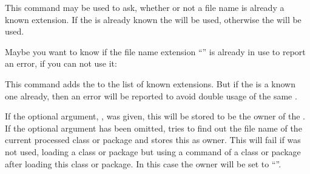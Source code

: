 \begin{Declaration}
\end{Declaration}
%
This command may be used to ask, whether or not a file name 
is already a known extension.  If the  is already known the
 will be used, otherwise the  will be used.
\begin{Example}
  Maybe you want to know if the file name extension ``'' is already
  in use to report an error, if you can not use it:
\begin{lstcode}
\end{lstcode}
\end{Example}
%

\begin{Declaration}
\end{Declaration}
%
This command adds the  to the list of known extensions. But
if the  is a known one already, then an error will be
reported to avoid double usage of the same .

If the optional argument, , was given, this 
will be stored to be the owner of the .  If the optional
argument has been omitted,  tries to find out the file name
of the current processed class or package and stores this as owner.
This will fail if  was not used,
loading a class or package but using a command of a class or package after
loading this class or package.  In this case the owner will be set to
``''.

